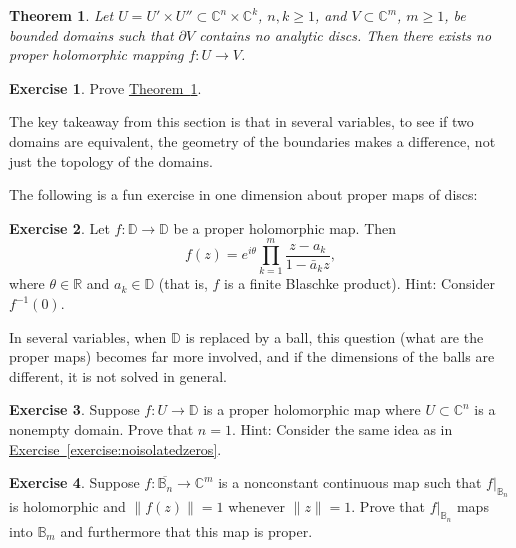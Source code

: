 \documentclass[12pt,openany]{book}
\newcommand{\snorm}[1]{\lVert {#1} \rVert}
\newcommand{\C}{{\mathbb{C}}}
\newcommand{\R}{{\mathbb{R}}}
\newcommand{\D}{{\mathbb{D}}}
\newcommand{\bB}{{\mathbb{B}}}
\theoremstyle{plain}
\newtheorem{thm}{Theorem}[section]
\theoremstyle{remark}
\theoremstyle{definition}
\newenvironment{exbox}{%
    \def\FrameCommand{\vrule width 1pt \relax\hspace{10pt}}%
    \MakeFramed{\advance\hsize-\width\FrameRestore}%
}{%
    \endMakeFramed
}
\theoremstyle{exercise}
\newtheorem{exercise}{Exercise}[section]
\theoremstyle{example}
\newcommand{\exerciseref}[1]{\hyperref[#1]{Exercise~\ref*{#1}}}
\newcommand{\thmref}[1]{\hyperref[#1]{Theorem~\ref*{#1}}}
\begin{document}
\begin{thm} \label{thm:nopropmapprodandnodisc}
Let $U = U' \times U'' \subset \C^n \times \C^k$, $n,k \geq 1$, and $V
\subset \C^m$, $m \geq 1$, be bounded
domains such that $\partial V$ contains no analytic discs.
Then there exists no proper
holomorphic mapping $f \colon U \to V$.
\end{thm}

\begin{exbox}
\begin{exercise}
Prove \thmref{thm:nopropmapprodandnodisc}.
\end{exercise}
\end{exbox}

The key takeaway from this section is that
in several variables, to see if two domains are equivalent,
the geometry of the boundaries makes a difference,
not just the topology of the domains.

\medskip

The following is a fun exercise in one dimension about proper maps of discs:

\begin{exbox}
\begin{exercise}
Let $f \colon \D \to \D$ be a proper holomorphic  map.  Then
\begin{equation*}
f(z) =
e^{i\theta} \prod_{k=1}^m \frac{z-a_k}{1-\bar{a}_k z} ,
\end{equation*}
where $\theta \in \R$ and $a_k \in \D$ (that is, $f$ is a finite
Blaschke product).  Hint: Consider $f^{-1}(0)$.
\end{exercise}
\end{exbox}

In several variables, when $\D$ is replaced by a ball,
this question (what are the proper maps)
becomes far more involved, and if the dimensions of the balls are
different, it is not solved in general.

\begin{exbox}
\begin{exercise}
Suppose $f \colon U \to \D$ is a proper holomorphic map where $U \subset
\C^n$ is a nonempty domain.  Prove that $n=1$.  Hint: Consider the same idea as in
\exerciseref{exercise:noisolatedzeros}.
\end{exercise}

\begin{exercise}
Suppose $f \colon \overline{\bB_n} \to \C^m$ is a nonconstant continuous
map such that $f|_{\bB_n}$ is holomorphic and $\snorm{f(z)} = 1$ whenever
$\snorm{z}=1$.  Prove that
$f|_{\bB_n}$ maps into $\bB_m$ and furthermore that this map is proper.
\end{exercise}
\end{exbox}
\end{document}
